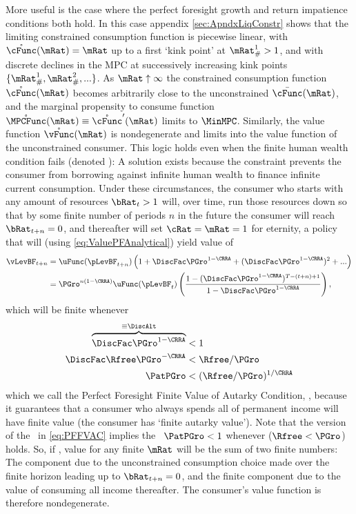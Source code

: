 \documentclass[BufferStockTheory]{subfiles}
\begin{document}
More useful is the case where the perfect foresight growth and return impatience conditions both hold.  In this case appendix \ref{sec:ApndxLiqConstr} shows that the limiting constrained consumption function is piecewise linear, with $\mathring{\cFunc}(\mRat)=\mRat$ up to a first `kink point' at $\mRat_{\#}^{1}>1$, and with discrete declines in the MPC at successively increasing kink points $\{\mRat_{\#}^{1},\mRat_{\#}^{2},...\}$.  As $\mRat \uparrow \infty$ the constrained consumption function $\mathring{\cFunc}(\mRat)$ becomes arbitrarily close to the unconstrained $\bar{\cFunc}(\mRat)$, and the marginal propensity to consume function $\mathring{\MPCFunc}(\mRat) \equiv \mathring{\cFunc}^{\prime}(\mRat)$ limits to $\MinMPC$.  Similarly, the value function $\mathring{\vFunc}(\mRat)$ is nondegenerate and limits into the value function of the unconstrained consumer.  This logic holds even when the finite human wealth condition fails (denoted \cncl{\FHWC}):  A solution exists because the constraint prevents the consumer from borrowing against infinite human wealth to finance infinite current consumption.  Under these circumstances, the consumer who starts with any amount of resources $\bRat_{t} > 1$ will, over time, run those resources down so that by some finite number of periods $n$ in the future the consumer will reach $\bRat_{t+n} = 0$, and thereafter will set $\cRat = \mRat = 1$ for eternity, a policy that will (using \eqref{eq:ValuePFAnalytical}) yield value of \hypertarget{PFFVAC}{}
\begin{align}
  \vLevBF_{t+n}  & = \uFunc(\pLevBF_{t+n})\left(1+\DiscFac
                   \PGro^{1-\CRRA}+(\DiscFac \PGro^{1-\CRRA})^{2}+...\right) \notag
  \\  & = \PGro^{n(1-\CRRA)} \uFunc(\pLevBF_{t})\left(\frac{1-(\DiscFac
        \PGro^{1-\CRRA})^{T-(t+n)+1}}{1-\DiscFac \PGro^{1-\CRRA}}\right),
        \notag
\end{align}
which will be finite whenever 
\begin{align}
  \overbrace{\DiscFac \PGro^{1-\CRRA} }^{\equiv \DiscAlt}  & < 1 \label{eq:PFFVAC}
  \\ \DiscFac \Rfree \PGro^{-\CRRA}  & < \Rfree/\PGro \nonumber
  \\ \PatPGro  & < (\Rfree/\PGro)^{1/\CRRA} \nonumber
\end{align}
which we call the Perfect Foresight Finite Value of Autarky Condition, \PFFVAC, because it guarantees that a consumer who always spends all of permanent income will have finite value (the consumer has `finite autarky value').  Note that the version of the \PFFVAC~in \eqref{eq:PFFVAC} implies the \PFGIC~$\PatPGro < 1$ whenever \cncl{\FHWC} ($\Rfree < \PGro$) holds.  So, if \cncl{\FHWC}, value for any finite $\mRat$ will be the sum of two finite numbers: The component due to the unconstrained consumption choice made over the finite horizon leading up to $\bRat_{t+n} = 0$, and the finite component due to the value of consuming all income thereafter.  The consumer's value function is therefore nondegenerate.
\end{document}

